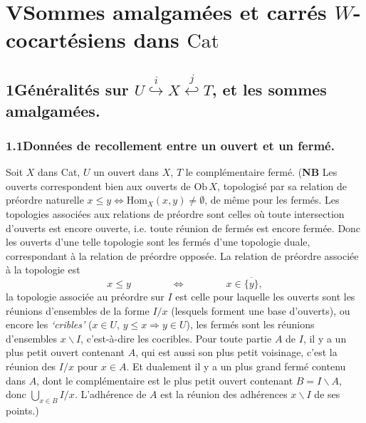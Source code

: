 \dgrchunkbegin



\section*{V\quad Sommes amalgamées et carrés $W$-cocartésiens dans $\mathrm{Cat}$}

\subsection*{1\quad Généralités sur $U \overset{i}{\hookrightarrow} X \overset{j}{\hookleftarrow} T$, et les sommes amalgamées.}

\subsubsection*{1.1\quad Données de recollement entre un ouvert et un fermé.}

Soit $X$ dans Cat, $U$ un ouvert dans $X$, $T$ le complémentaire fermé. (\textbf{NB} Les ouverts correspondent bien aux ouverts de $\mathrm{Ob}\,X$, topologisé par sa relation de préordre naturelle $x \leq y \iff \mathrm{Hom}_X(x,y) \neq \emptyset$, de même pour les fermés. Les topologies associées aux relations de préordre sont celles où toute intersection d'ouverts est encore ouverte, i.e. toute réunion de fermés est encore fermée. Donc les ouverts d'une telle topologie sont les fermés d'une topologie duale, correspondant à la relation de préordre opposée. La relation de préordre associée à la topologie est
\[
x \leq y \qquad\qquad \iff \qquad\qquad x \in \overline{\{y\}},
\]
la topologie associée au préordre sur $I$ est celle pour laquelle les ouverts sont les réunions d'ensembles de la forme $I/x$ (lesquels forment une base d'ouverts), ou encore les \textit{`cribles'} ($x \in U$, $y \leq x \Longrightarrow y \in U$), les fermés sont les réunions d'ensembles $x\backslash I$, c'est-à-dire les cocribles. Pour toute partie $A$ de $I$, il y a un plus petit ouvert contenant $A$, qui est aussi son plus petit voisinage, c'est la réunion des $I/x$ pour $x \in A$. Et dualement il y a un plus grand fermé contenu dans $A$, dont le complémentaire est le plus petit ouvert contenant $B = I\backslash A$, donc $\bigcup_{x\in B} I/x$. L'adhérence de $A$ est la réunion des adhérences $x\backslash I$ de ses points.)

